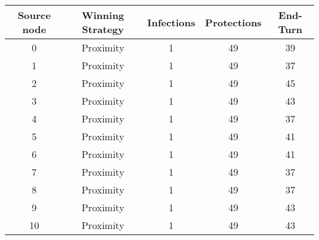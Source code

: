 \documentclass[results.tex]{subfiles}
\begin{document}
    \begin{center}
        \begin{tabular}{| c || c | c | c | c |}
            \hline
            {\bfseries Source node} & {\bfseries Winning Strategy} & {\bfseries Infections} & {\bfseries Protections}
            & {\bfseries End-Turn}
            \\  %
            \hline\hline
            0                       & Proximity                    & 1                      & 49                      & 39                   \\
            \hline
            1                       & Proximity                    & 1                      & 49                      & 37                   \\
            \hline
            2                       & Proximity                    & 1                      & 49                      & 45                   \\
            \hline
            3                       & Proximity                    & 1                      & 49                      & 43                   \\
            \hline
            4                       & Proximity                    & 1                      & 49                      & 37                   \\
            \hline
            5                       & Proximity                    & 1                      & 49                      & 41                   \\
            \hline
            6                       & Proximity                    & 1                      & 49                      & 41                   \\
            \hline
            7                       & Proximity                    & 1                      & 49                      & 37                   \\
            \hline
            8                       & Proximity                    & 1                      & 49                      & 37                   \\
            \hline
            9                       & Proximity                    & 1                      & 49                      & 43                   \\
            \hline
            10                      & Proximity                    & 1                      & 49                      & 43                   \\

\end{tabular}
\end{center}
\end{document}
